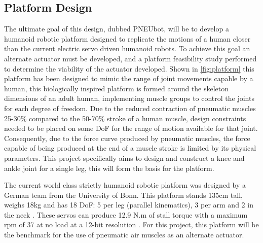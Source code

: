 \documentclass[11pt,a4paper]{article}
\begin{document}
\subsection{Platform Design}
\label{sub:platform_design}
The ultimate goal of this design, dubbed PNEUbot, will be to develop a humanoid robotic platform designed to replicate the motions of a human closer than the current electric servo driven humanoid robots. To achieve this goal an alternate actuator must be developed, and a platform feasibility study performed to determine the viability of the actuator developed. Shown in \cref{fig:platform} this platform has been designed to mimic the range of joint movements capable by a human, this biologically inspired platform is formed around the skeleton dimensions of an adult human, implementing muscle groups to control the joints for each degree of freedom. Due to the reduced contraction of pneumatic muscles 25-30\% compared to the 50-70\% stroke of a human muscle, design constraints needed to be placed on some DoF for the range of motion available for that joint. Consequently, due to the force curve produced by pneumatic muscles, the force capable of being produced at the end of a muscle stroke is limited by its physical parameters. This project specifically aims to design and construct a knee and ankle joint for a single leg, this will form the basis for the platform.\newline

The current world class strictly humanoid robotic platform was designed by a German team from the University of Bonn. This platform stands 135cm tall, weighs 18kg and has 18 DoF: 5 per leg (parallel kinematics), 3 per arm and 2 in the neck \cite{ficht_farazi_brandenburger_rodriguez_pavlichenko_allgeuer_hosseini_behnke_2018}. These servos can produce 12.9 N.m of stall torque with a maximum rpm of 37 at no load at a 12-bit resolution \cite{robotis}. For this project, this platform will be the benchmark for the use of pneumatic air muscles as an alternate actuator. \newline
\end{document}
